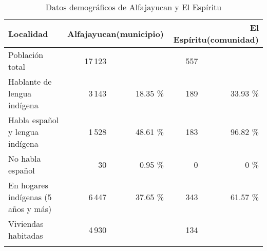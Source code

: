 \documentclass[output=paper]{../langscibook}
\begin{document}

\begin{table}
\caption{\label{tab:guerrero:3} Datos demográficos de Alfajayucan y El Espíritu \citep{INEGI2010}}
\begin{tabularx}{\textwidth}{Xrrrr}
\lsptoprule
Localidad & \multicolumn{2}{p{2.5cm}}{Alfajayucan\newline (municipio)} & \multicolumn{2}{p{2.5cm}}{El Espíritu\newline (comunidad)}\\
\midrule
Población total &  17\,123 && 557 &\\
Hablante de lengua indígena & 3\,143 &18.35 \%& 189 & 33.93 \%\\
Habla español y lengua indígena & 1\,528 &48.61 \%& 183 & 96.82 \% \\
No habla español & 30 & 0.95 \% &  0& 0 \% \\
En hogares indígenas (5 años y más)& 6\,447 & 37.65 \%&  343 & 61.57 \% \\
Viviendas habitadas & 4\,930  &&  134 & \\
\lspbottomrule
\end{tabularx}
\end{table}
\end{document}

